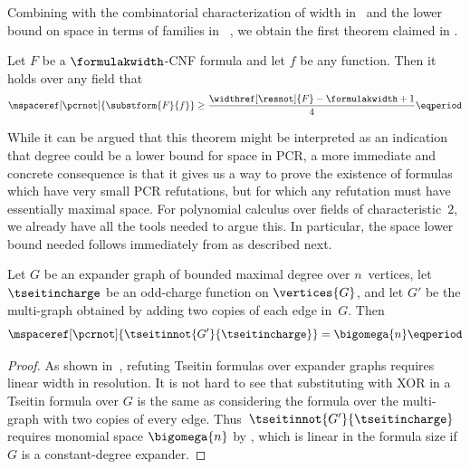 \documentclass{toc}
\begin{document}
Combining 
with the combinatorial characterization of width in~%
and the lower bound on space in terms of \kextendibleNok families in~%
,
we obtain the first theorem claimed in 
.


%
%
%
%
\begin{theorem}
%
  Let $F$ be a $\formulakwidth$-CNF formula and let $f$ be any
  \nonauthor{} function. Then
  it holds over any field that %
  \begin{equation*}
    \mspaceref[\pcrnot]{\substform{F}{f}} 
    \geq 
    \frac{\widthref[\resnot]{F} - \formulakwidth + 1}{4} \eqperiod
  \end{equation*}
%
\end{theorem}

While it can be argued that this theorem might be interpreted as an
indication that degree could be a lower bound for space in PCR, a more
immediate and concrete consequence is that 
it gives us a way to prove the existence of formulas which have very
small PCR refutations, but for which any refutation must
have essentially maximal space. 
%
For polynomial calculus over fields of characteristic~$2$, we already
have all the tools needed to argue this. In particular, 
the space lower bound needed
follows immediately from
as described next.

\begin{corollary}\label{cor:tseitin-double}
  Let $G$ be
%
%
  an expander graph of bounded maximal %
  degree over $n$~vertices,
  let
  $\tseitincharge$ be an odd-charge function on 
  $\vertices{G}$,
  and let $G'$ be 
  the multi-graph obtained by adding two copies of each edge in~$G$.
%
  Then
  \begin{equation*}
    \mspaceref[\pcrnot]{\tseitinnot{G'}{\tseitincharge}} =
    \bigomega{n}
    \eqperiod
  \end{equation*}
\end{corollary}
\begin{proof}
  As shown in~\cite{BW01ShortProofs},
  refuting Tseitin formulas over expander graphs requires linear width
  in resolution. It is not hard to see that substituting with XOR in a
  Tseitin formula over $G$ is the same as considering 
  the formula over the multi-graph with two copies of every edge.
  Thus~$\tseitinnot{G'}{\tseitincharge}$ requires monomial space
  $\bigomega{n}$ 
  by
 ,
  which is linear in the formula size if $G$ is a constant-degree expander.
\end{proof}
\end{document}
